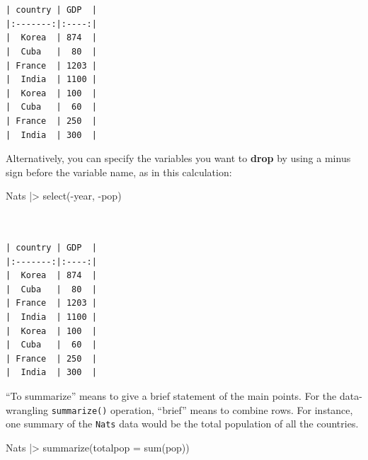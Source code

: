 \documentclass[
  letterpaper,
  DIV=11,
  numbers=noendperiod,
  oneside]{scrartcl}
\newenvironment{Shaded}{\begin{snugshade}}{\end{snugshade}}
\newcommand{\AttributeTok}[1]{\textcolor[rgb]{0.40,0.45,0.13}{#1}}
\newcommand{\FunctionTok}[1]{\textcolor[rgb]{0.28,0.35,0.67}{#1}}
\newcommand{\NormalTok}[1]{\textcolor[rgb]{0.00,0.23,0.31}{#1}}
\newcommand{\SpecialCharTok}[1]{\textcolor[rgb]{0.37,0.37,0.37}{#1}}
\begin{document}
\begin{verbatim}


| country | GDP  |
|:-------:|:----:|
|  Korea  | 874  |
|  Cuba   |  80  |
| France  | 1203 |
|  India  | 1100 |
|  Korea  | 100  |
|  Cuba   |  60  |
| France  | 250  |
|  India  | 300  |
\end{verbatim}

Alternatively, you can specify the variables you want to \textbf{drop}
by using a minus sign before the variable name, as in this calculation:

\begin{Shaded}
\begin{Highlighting}[]
\NormalTok{Nats }\SpecialCharTok{|\textgreater{}} \FunctionTok{select}\NormalTok{(}\SpecialCharTok{{-}}\NormalTok{year, }\SpecialCharTok{{-}}\NormalTok{pop)}
\end{Highlighting}
\end{Shaded}

\begin{verbatim}


| country | GDP  |
|:-------:|:----:|
|  Korea  | 874  |
|  Cuba   |  80  |
| France  | 1203 |
|  India  | 1100 |
|  Korea  | 100  |
|  Cuba   |  60  |
| France  | 250  |
|  India  | 300  |
\end{verbatim}

\begin{tcolorbox}[enhanced jigsaw, colbacktitle=quarto-callout-note-color!10!white, opacityback=0, breakable, opacitybacktitle=0.6, colback=white, coltitle=black, arc=.35mm, title={5. summarize()}, left=2mm, colframe=quarto-callout-note-color-frame, rightrule=.15mm, bottomrule=.15mm, leftrule=.75mm, bottomtitle=1mm, toptitle=1mm, titlerule=0mm, toprule=.15mm]

\end{tcolorbox}

``To summarize'' means to give a brief statement of the main points. For
the data-wrangling \texttt{summarize()} operation, ``brief'' means to
combine rows. For instance, one summary of the \texttt{Nats} data would
be the total population of all the countries.

\begin{Shaded}
\begin{Highlighting}[]
\NormalTok{Nats }\SpecialCharTok{|\textgreater{}} \FunctionTok{summarize}\NormalTok{(}\AttributeTok{totalpop =} \FunctionTok{sum}\NormalTok{(pop))}
\end{Highlighting}
\end{Shaded}
\end{document}
